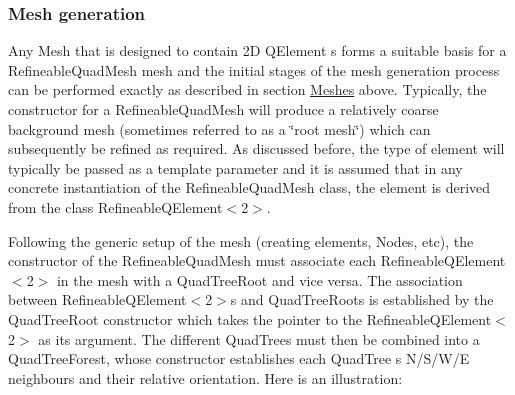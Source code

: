 \hypertarget{index_RefineableQuadMesh_setup_section}{}\subsubsection{Mesh generation}\label{index_RefineableQuadMesh_setup_section}
Any {\ttfamily Mesh} that is designed to contain 2D {\ttfamily Q\+Element} s forms a suitable basis for a {\ttfamily Refineable\+Quad\+Mesh} mesh and the initial stages of the mesh generation process can be performed exactly as described in section \hyperlink{index_meshes}{Meshes} above. Typically, the constructor for a {\ttfamily Refineable\+Quad\+Mesh} will produce a relatively coarse background mesh (sometimes referred to as a \char`\"{}root mesh\char`\"{}) which can subsequently be refined as required. As discussed before, the type of element will typically be passed as a template parameter and it is assumed that in any concrete instantiation of the {\ttfamily Refineable\+Quad\+Mesh} class, the element is derived from the class {\ttfamily Refineable\+Q\+Element$<$2$>$}.

Following the generic setup of the mesh (creating elements, {\ttfamily Nodes}, etc), the constructor of the {\ttfamily Refineable\+Quad\+Mesh} must associate each {\ttfamily Refineable\+Q\+Element$<$2$>$} in the mesh with a {\ttfamily Quad\+Tree\+Root} and vice versa. The association between {\ttfamily Refineable\+Q\+Element$<$2$>$s} and {\ttfamily Quad\+Tree\+Roots} is established by the {\ttfamily Quad\+Tree\+Root} constructor which takes the pointer to the {\ttfamily Refineable\+Q\+Element$<$2$>$} as its argument. The different {\ttfamily Quad\+Trees} must then be combined into a {\ttfamily Quad\+Tree\+Forest}, whose constructor establishes each {\ttfamily Quad\+Tree} \textquotesingle{}s N/\+S/\+W/E neighbours and their relative orientation. Here is an illustration\+:





